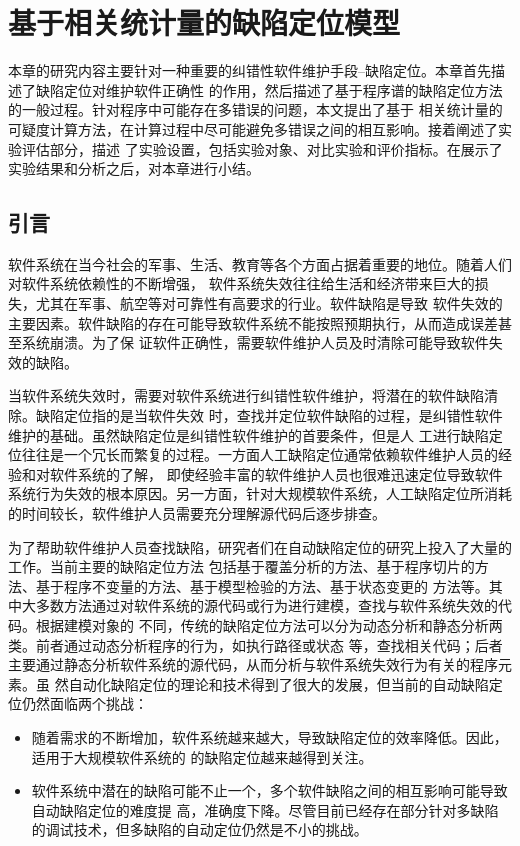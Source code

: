 
\chapter{基于相关统计量的缺陷定位模型}
本章的研究内容主要针对一种重要的纠错性软件维护手段--缺陷定位。本章首先描述了缺陷定位对维护软件正确性
的作用，然后描述了基于程序谱的缺陷定位方法的一般过程。针对程序中可能存在多错误的问题，本文提出了基于
相关统计量的可疑度计算方法，在计算过程中尽可能避免多错误之间的相互影响。接着阐述了实验评估部分，描述
了实验设置，包括实验对象、对比实验和评价指标。在展示了实验结果和分析之后，对本章进行小结。

\section{引言}
软件系统在当今社会的军事、生活、教育等各个方面占据着重要的地位。随着人们对软件系统依赖性的不断增强，
软件系统失效往往给生活和经济带来巨大的损失，尤其在军事、航空等对可靠性有高要求的行业。软件缺陷是导致
软件失效的主要因素。软件缺陷的存在可能导致软件系统不能按照预期执行，从而造成误差甚至系统崩溃。为了保
证软件正确性，需要软件维护人员及时清除可能导致软件失效的缺陷。

当软件系统失效时，需要对软件系统进行纠错性软件维护，将潜在的软件缺陷清除。缺陷定位指的是当软件失效
时，查找并定位软件缺陷的过程，是纠错性软件维护的基础。虽然缺陷定位是纠错性软件维护的首要条件，但是人
工进行缺陷定位往往是一个冗长而繁复的过程。一方面人工缺陷定位通常依赖软件维护人员的经验和对软件系统的了解，
即使经验丰富的软件维护人员也很难迅速定位导致软件系统行为失效的根本原因。另一方面，针对大规模软件系统，人工缺陷定位所消耗的时间较长，软件维护人员需要充分理解源代码后逐步排查。

为了帮助软件维护人员查找缺陷，研究者们在自动缺陷定位的研究上投入了大量的工作。当前主要的缺陷定位方法
包括基于覆盖分析的方法、基于程序切片的方法、基于程序不变量的方法、基于模型检验的方法、基于状态变更的
方法等。其中大多数方法通过对软件系统的源代码或行为进行建模，查找与软件系统失效的代码。根据建模对象的
不同，传统的缺陷定位方法可以分为动态分析和静态分析两类。前者通过动态分析程序的行为，如执行路径或状态
等，查找相关代码；后者主要通过静态分析软件系统的源代码，从而分析与软件系统失效行为有关的程序元素。虽
然自动化缺陷定位的理论和技术得到了很大的发展，但当前的自动缺陷定位仍然面临两个挑战：

\begin{itemize}
      \item 随着需求的不断增加，软件系统越来越大，导致缺陷定位的效率降低。因此，适用于大规模软件系统的
   的缺陷定位越来越得到关注。
      \item 软件系统中潜在的缺陷可能不止一个，多个软件缺陷之间的相互影响可能导致自动缺陷定位的难度提
      高，准确度下降。尽管目前已经存在部分针对多缺陷的调试技术，但多缺陷的自动定位仍然是不小的挑战。
\end{itemize}

